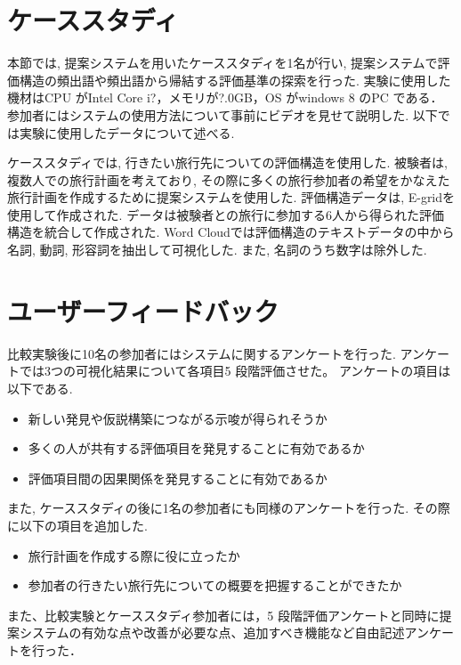 \documentclass[syuuron]{kuee}
\begin{document}
	\section{ケーススタディ}
		本節では, 提案システムを用いたケーススタディを1名が行い, 提案システムで評価構造の頻出語や頻出語から帰結する評価基準の探索を行った. 
		実験に使用した機材はCPU がIntel Core i?，メモリが?.0GB，OS がwindows 8 のPC である．
		参加者にはシステムの使用方法について事前にビデオを見せて説明した. 以下では実験に使用したデータについて述べる. 
		
		ケーススタディでは, 行きたい旅行先についての評価構造を使用した. 
		被験者は, 複数人での旅行計画を考えており, その際に多くの旅行参加者の希望をかなえた旅行計画を作成するために提案システムを使用した. 
		評価構造データは, E-gridを使用して作成された. 
		データは被験者との旅行に参加する6人から得られた評価構造を統合して作成された. 
		Word Cloudでは評価構造のテキストデータの中から名詞, 動詞, 形容詞を抽出して可視化した. 
		また, 名詞のうち数字は除外した. 
		
	\section{ユーザーフィードバック}
		比較実験後に10名の参加者にはシステムに関するアンケートを行った. 
		アンケートでは3つの可視化結果について各項目5 段階評価させた。
		アンケートの項目は以下である. 
		\begin{itemize}
			\item 新しい発見や仮説構築につながる示唆が得られそうか
			\item 多くの人が共有する評価項目を発見することに有効であるか
			\item 評価項目間の因果関係を発見することに有効であるか
		\end{itemize}
		また, ケーススタディの後に1名の参加者にも同様のアンケートを行った. 
		その際に以下の項目を追加した. 
		\begin{itemize}
			\item 旅行計画を作成する際に役に立ったか
			\item 参加者の行きたい旅行先についての概要を把握することができたか
		\end{itemize}
		また、比較実験とケーススタディ参加者には，5 段階評価アンケートと同時に提案システムの有効な点や改善が必要な点、追加すべき機能など自由記述アンケートを行った．
\end{document}
